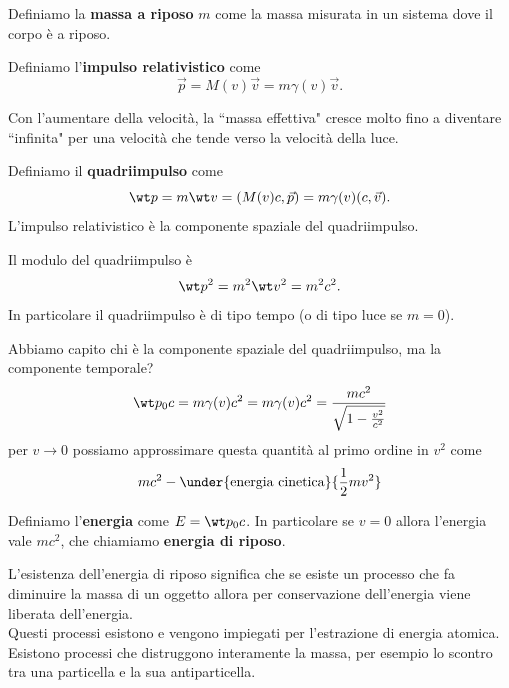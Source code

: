 \begin{definition}
Definiamo la \textbf{massa a riposo} $m$ come la massa misurata in un sistema dove il corpo \`e a riposo.
\end{definition}

\begin{definition}
Definiamo l'\textbf{impulso relativistico} come
\[\vec p=M(v)\vec v=m\gamma(v)\vec v.\]
\end{definition}
\begin{remark}
Con l'aumentare della velocit\`a, la ``massa effettiva" cresce molto fino a diventare ``infinita" per una velocit\`a che tende verso la velocit\`a della luce.
\end{remark}

\begin{definition}[Quadriimpulso]
Definiamo il \textbf{quadriimpulso} come
\[\wt p=m\wt v=(M(v)c,\vec p)=m\gamma(v)(c,\vec v).\]
L'impulso relativistico \`e la componente spaziale del quadriimpulso.
\end{definition}

\begin{remark}
Il modulo del quadriimpulso \`e
\[\wt p^2=m^2\wt v^2=m^2c^2.\]
In particolare il quadriimpulso \`e di tipo tempo (o di tipo luce se $m=0$).
\end{remark}

\noindent Abbiamo capito chi \`e la componente spaziale del quadriimpulso, ma la componente temporale?
\[\wt p_0c=m\gamma(v)c^2=m\gamma(v)c^2=\frac{mc^2}{\sqrt{1-\frac{v^2}{c^2}}}\]
per $v\to 0$ possiamo approssimare questa quantit\`a al primo ordine in $v^2$ come
\[mc^2-\under{\text{energia cinetica}}{\frac12 mv^2}\]

\begin{definition}[Energia]
Definiamo l'\textbf{energia} come $E=\wt p_0c$. In particolare se $v=0$ allora l'energia vale $mc^2$, che chiamiamo \textbf{energia di riposo}.
\end{definition}

\begin{remark}
L'esistenza dell'energia di riposo significa che se esiste un processo che fa diminuire la massa di un oggetto allora per conservazione dell'energia viene liberata dell'energia.\\
Questi processi esistono e vengono impiegati per l'estrazione di energia atomica.\\
Esistono processi che distruggono interamente la massa, per esempio lo scontro tra una particella e la sua antiparticella.
\end{remark}

